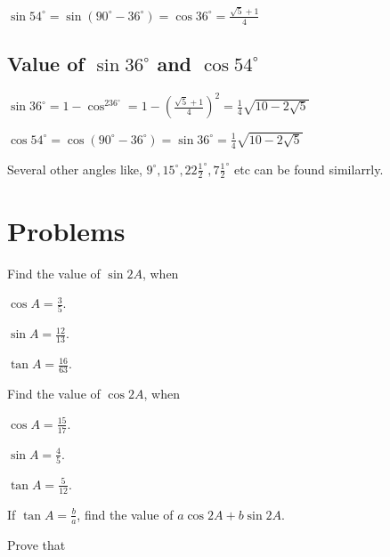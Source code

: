 \noindent $\sin 54^\circ = \sin(90^\circ - 36^\circ) = \cos36^\circ = \frac{\sqrt{5} + 1}{4}$

\subsection{Value of $\sin 36^\circ$ and $\cos 54^\circ$}
$\sin36^\circ = 1 - \cos^236^\circ = 1 - \left(\frac{\sqrt{5} + 1}{4}\right)^2 = \frac{1}{4}\sqrt{10 - 2\sqrt{5}}$

\noindent$\cos54^\circ = \cos(90^\circ - 36^\circ) = \sin36^\circ = \frac{1}{4}\sqrt{10 - 2\sqrt{5}}$

\noindent Several other angles like, $9^\circ, 15^\circ, 22\frac{1}{2}^\circ, 7\frac{1}{2}^\circ$ etc can be found similarrly.

\section{Problems}
\startitemize[n]
\item Find the value of $\sin 2A$, when
  \startitemize[a]
  \item $\cos A = \frac{3}{5}$.
  \item $\sin A = \frac{12}{13}$.
  \item $\tan A = \frac{16}{63}$.
    \stopitemize
\item Find the value of $\cos 2A$, when
  \startitemize[a]
  \item $\cos A = \frac{15}{17}$.
  \item $\sin A = \frac{4}{5}$.
  \item $\tan A = \frac{5}{12}$.
    \stopitemize
\item If $\tan A = \frac{b}{a}$, find the value of $a\cos 2A+ b\sin 2A$.
\stopitemize

Prove that

